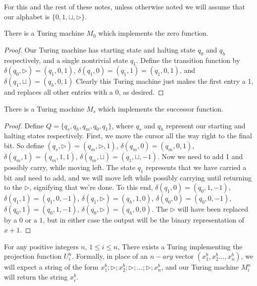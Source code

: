 \par For this and the rest of these notes, unless otherwise noted we will assume that our alphabet is $\{0,1,\sqcup,\triangleright\}$.
\begin{lemma}
    There is a Turing machine $M_0$ which implements the zero function.
\end{lemma}
\begin{proof}
     Our Turing machine has starting state and halting state $q_0$ and $q_h$ respectively, and a single nontrivial state $q_1$. Define the transition function by $\delta(q_0,\triangleright) = (q_1,0,1)$, $\delta(q_1,0)=(q_1,1) = (q_1,0,1)$, and $\delta(q_1,\sqcup) = (q_h,0,1)$ Clearly this Turing machine just makes the first entry a 1, and replaces all other entries with a 0, as desired.
\end{proof}
\begin{lemma}
    There is a Turing machine $M_s$ which implements the successor function. 
\end{lemma}
\begin{proof}
    Define $Q=\{q_s,q_h,q_m,q_0,q_1\}$, where $q_s$ and $q_h$ represent our starting and halting states respectively. 
    First, we move the cursor all the way right to the final bit. So define $(q_s,\triangleright) = (q_m,\triangleright,1)$, $\delta(q_m,0)=(q_m,0,1)$, $\delta(q_m,1)=(q_m,1,1)$, $\delta(q_m,\sqcup)=(q_1,\sqcup,-1)$. Now we need to add 1 and possibly carry, while moving left. The state $q_1$ represents that we have carried a bit and need to add, and we will move left while possibly carrying until returning to the $\triangleright$, signifying that we're done. To this end, $\delta(q_1,0)=(q_0,1,-1)$, $\delta(q_1,1)=(q_1,0,-1)$, $\delta(q_1,\triangleright)=(q_h,1,0)$, $\delta(q_0,0)=(q_0,0,-1)$, $\delta(q_0,1)=(q_0,1,-1)$, $\delta(q_0,\triangleright)=(q_h,0,0)$. The $\triangleright$ will have been replaced by a $0$ or a $1$, but in either case the output will be the binary representation of $x+1$. 
\end{proof}
\begin{lemma}
    For any positive integers $n$, $1 \leq i\leq n$, There exists a Turing implementing the projection function $U_i^n$. Formally, in place of an $n-ary$ vector $(x_1^b,x_2^b...,x_n^b)$, we will expect a string of the form $x_1^b;\triangleright;x_2^b;\triangleright;...;\triangleright;x_n^b$, and our Turing machine $M_i^n$ will return the string $x_i^b$.
\end{lemma}
